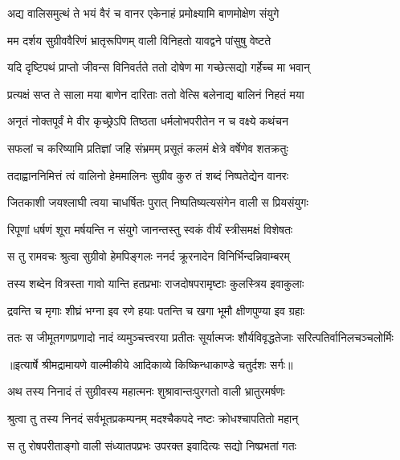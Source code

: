 \twolineshloka
{अद्य वालिसमुत्थं ते भयं वैरं च वानर}
{एकेनाहं प्रमोक्ष्यामि बाणमोक्षेण संयुगे} %

\twolineshloka
{मम दर्शय सुग्रीववैरिणं भ्रातृरूपिणम्}
{वाली विनिहतो यावद्वने पांसुषु वेष्टते} %

\twolineshloka
{यदि दृष्टिपथं प्राप्तो जीवन्स विनिवर्तते}
{ततो दोषेण मा गच्छेत्सद्यो गर्हेच्च मा भवान्} %

\twolineshloka
{प्रत्यक्षं सप्त ते साला मया बाणेन दारिताः}
{ततो वेत्सि बलेनाद्य बालिनं निहतं मया} %

\twolineshloka
{अनृतं नोक्तपूर्वं मे वीर कृच्छ्रेऽपि तिष्ठता}
{धर्मलोभपरीतेन न च वक्ष्ये कथंचन} %

\twolineshloka
{सफलां च करिष्यामि प्रतिज्ञां जहि संभ्रमम्}
{प्रसूतं कलमं क्षेत्रे वर्षेणेव शतक्रतुः} %

\twolineshloka
{तदाह्वाननिमित्तं त्वं वालिनो हेममालिनः}
{सुग्रीव कुरु तं शब्दं निष्पतेद्येन वानरः} %

\twolineshloka
{जितकाशी जयश्लाघी त्वया चाधर्षितः पुरात्}
{निष्पतिष्यत्यसंगेन वाली स प्रियसंयुगः} %

\twolineshloka
{रिपूणां धर्षणं शूरा मर्षयन्ति न संयुगे}
{जानन्तस्तु स्वकं वीर्यं स्त्रीसमक्षं विशेषतः} %

\twolineshloka
{स तु रामवचः श्रुत्वा सुग्रीवो हेमपिङ्गलः}
{ननर्द क्रूरनादेन विनिर्भिन्दन्निवाम्बरम्} %

\twolineshloka
{तस्य शब्देन वित्रस्ता गावो यान्ति हतप्रभाः}
{राजदोषपरामृष्टाः कुलस्त्रिय इवाकुलाः} %

\twolineshloka
{द्रवन्ति च मृगाः शीघ्रं भग्ना इव रणे हयाः}
{पतन्ति च खगा भूमौ क्षीणपुण्या इव ग्रहाः} %

\fourlineindentedshloka
{ततः स जीमूतगणप्रणादो}
{ नादं व्यमुञ्चत्त्वरया प्रतीतः}
{सूर्यात्मजः शौर्यविवृद्धतेजाः}
{ सरित्पतिर्वानिलचञ्चलोर्मिः} %


{॥इत्यार्षे श्रीमद्रामायणे वाल्मीकीये आदिकाव्ये किष्किन्धाकाण्डे चतुर्दशः सर्गः॥}


\twolineshloka
{अथ तस्य निनादं तं सुग्रीवस्य महात्मनः}
{शुश्रावान्तःपुरगतो वाली भ्रातुरमर्षणः} %

\twolineshloka
{श्रुत्वा तु तस्य निनदं सर्वभूतप्रकम्पनम्}
{मदश्चैकपदे नष्टः क्रोधश्चापतितो महान्} %

\twolineshloka
{स तु रोषपरीताङ्गो वाली संध्यातपप्रभः}
{उपरक्त इवादित्यः सद्यो निष्प्रभतां गतः} %

